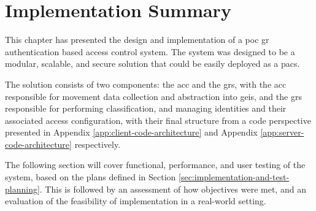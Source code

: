 \section{Implementation Summary}
\label{sec:implementation-summary}

This chapter has presented the design and implementation of a \ac{poc} \ac{gr} authentication based access control system.
The system was designed to be a modular, scalable, and secure solution that could be easily deployed as a \ac{pacs}.

The solution consists of two components: the \ac{acc} and the \ac{grs}, with the \ac{acc} responsible for movement data collection and abstraction into \acp{gei}, and the \ac{grs} responsible for performing classification, and managing identities and their associated access configuration, with their final structure from a code perspective presented in Appendix \ref{app:client-code-architecture} and Appendix \ref{app:server-code-architecture} respectively.

The following section will cover functional, performance, and user testing of the system, based on the plans defined in Section \ref{sec:implementation-and-test-planning}.
This is followed by an assessment of how objectives were met, and an evaluation of the feasibility of implementation in a real-world setting.